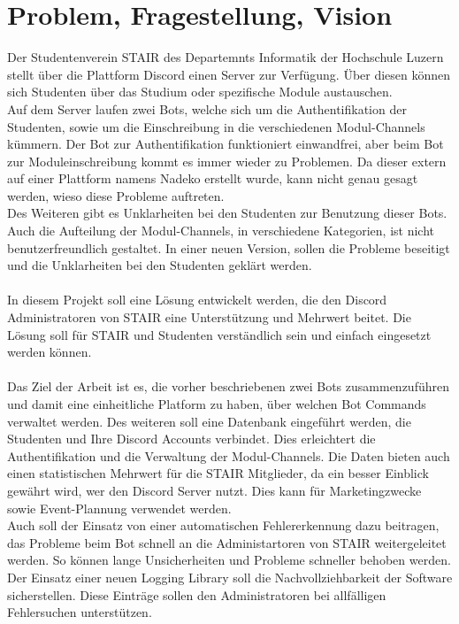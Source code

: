 \documentclass[a4paper, table]{article}
\begin{document}
\section{Problem, Fragestellung, Vision}
Der Studentenverein STAIR des Departemnts Informatik der Hochschule Luzern stellt über die Plattform Discord einen Server zur Verfügung.
Über diesen können sich Studenten über das Studium oder spezifische Module austauschen.\\
Auf dem Server laufen zwei Bots, welche sich um die Authentifikation der Studenten, sowie um die Einschreibung in die verschiedenen Modul-Channels kümmern.
Der Bot zur Authentifikation funktioniert einwandfrei, aber beim Bot zur Moduleinschreibung kommt es immer wieder zu Problemen.
Da dieser extern auf einer Plattform namens Nadeko erstellt wurde, kann nicht genau gesagt werden, wieso diese Probleme auftreten.\\
Des Weiteren gibt es Unklarheiten bei den Studenten zur Benutzung dieser Bots.
Auch die Aufteilung der Modul-Channels, in verschiedene Kategorien, ist nicht benutzerfreundlich gestaltet.
In einer neuen Version, sollen die Probleme beseitigt und die Unklarheiten bei den Studenten geklärt werden.\\\\
In diesem Projekt soll eine Lösung entwickelt werden, die den Discord Administratoren von STAIR eine Unterstützung und Mehrwert beitet.
Die Lösung soll für STAIR und Studenten verständlich sein und einfach eingesetzt werden können.\\\\
Das Ziel der Arbeit ist es, die vorher beschriebenen zwei Bots zusammenzuführen und damit eine einheitliche Platform zu haben, über welchen Bot Commands verwaltet werden.
Des weiteren soll eine Datenbank eingeführt werden, die Studenten und Ihre Discord Accounts verbindet.
Dies erleichtert die Authentifikation und die Verwaltung der Modul-Channels.
Die Daten bieten auch einen statistischen Mehrwert für die STAIR Mitglieder, da ein besser Einblick gewährt wird, wer den Discord Server nutzt.
Dies kann für Marketingzwecke sowie Event-Plannung verwendet werden.\\
Auch soll der Einsatz von einer automatischen Fehlererkennung dazu beitragen, das Probleme beim Bot schnell an die Administartoren von STAIR weitergeleitet werden.
So können lange Unsicherheiten und Probleme schneller behoben werden.
Der Einsatz einer neuen Logging Library soll die Nachvollziehbarkeit der Software sicherstellen.
Diese Einträge sollen den Administratoren bei allfälligen Fehlersuchen unterstützen.\\\\ 
\end{document}
